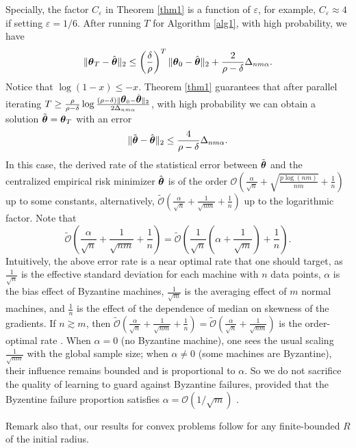 \documentclass[12pt,a4paper]{article}%
\newcommand{\be}{\begin{equation}}
\newcommand{\ee}{\end{equation}}
\newcommand \vc[1]{{\mbox{\boldmath${#1}$}}}
\newcommand \vtheta{\vc \theta}
\numberwithin{equation}{section}
\newcommand{\sbr}[1]{\left(#1\right)}        %
\begin{document}
Specially, the factor $C_\varepsilon$  in Theorem \ref{thm1}  is a function of $\varepsilon$, for example, $C_\varepsilon\approx4$ if setting $\varepsilon=1/6$. After running $T$ for Algorithm \ref{alg1}, with high probability, we have
\be\label{eq3-T1}
\|\vtheta_T-\hat{\vtheta}\|_2\leq \sbr{\frac{\delta}{\rho}}^T\|\vtheta_{0}-\hat{\vtheta}\|_2+\frac{2}{\rho-\delta}\Delta_{nm\alpha}.
\ee
Notice that $\log (1-x)\leq -x$. Theorem \ref{thm1} guarantees that after parallel iterating $T\geq \frac{\rho}{\rho-\delta}\log \frac{(\rho-\delta)\|\vtheta_{0}-\hat{\vtheta}\|_2}{2\Delta_{nm\alpha}}$, with high probability we can obtain a solution $\tilde{\vtheta}=\vtheta_T$ with an error
$$\|\tilde{\vtheta}-\hat{\vtheta}\|_2\leq \frac{4}{\rho-\delta}\Delta_{nm\alpha}.$$
In this case, the derived rate of the statistical error between $\tilde{\vtheta}$ and the centralized empirical
risk minimizer $\hat{\vtheta}$ is of the order $\mathcal{O}\sbr{\frac{\alpha}{\sqrt{n}}+\sqrt{\frac{p\log (nm)}{nm}}+\frac{1}{n}}$ up to some constants, alternatively, $\tilde{\mathcal{O}}\sbr{\frac{\alpha}{\sqrt{n}}+\frac{1}{\sqrt{nm}}+\frac{1}{n}}$ up to the logarithmic factor. Note that
$$\tilde{\mathcal{O}}\sbr{\frac{\alpha}{\sqrt{n}}+\frac{1}{\sqrt{nm}}+\frac{1}{n}}=\tilde{\mathcal{O}}\sbr{\frac{1}{\sqrt{n}}(\alpha+\frac{1}{\sqrt{m}})+\frac{1}{n}}.$$
Intuitively, the above error rate is a near optimal rate that one should target, as $\frac{1}{\sqrt{n}}$ is the effective standard deviation for each machine with $n$ data points, $\alpha$ is the bias effect of Byzantine machines, $\frac{1}{\sqrt{m}}$ is the averaging effect of $m$ normal machines, and $\frac{1}{n}$ is the effect of the dependence of median on skewness of the gradients. If $n\gtrsim m$, then $\tilde{\mathcal{O}}\sbr{\frac{\alpha}{\sqrt{n}}+\frac{1}{\sqrt{nm}}+\frac{1}{n}}
=\tilde{\mathcal{O}}\sbr{\frac{\alpha}{\sqrt{n}}+\frac{1}{\sqrt{nm}}}$ is the order-optimal rate \citep{YinChenRB2018}.
When $\alpha=0$ (no Byzantine machine), one sees the usual scaling $\frac{1}{\sqrt{nm}}$ with the global sample size; when $\alpha\neq0$ (some machines are Byzantine), their influence remains bounded and is proportional to $\alpha$. So we do not sacrifice the quality of learning  to guard against Byzantine failures, provided that the Byzentine failure proportion satisfies  $\alpha=\mathcal{O}(1/\sqrt{m})$ .

Remark also that, our results for convex problems follow for any finite-bounded  $R$ of the initial radius.
\end{document}
